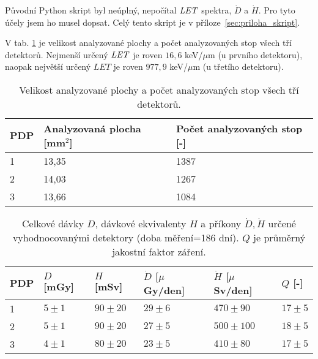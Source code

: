 
Původní Python skript byl neúplný, nepočítal $\mathit{LET}$ spektra, $\dot{D}$ a $\dot{H}$. Pro tyto účely jsem ho musel dopsat. Celý tento skript je v příloze~\ref{sec:priloha_skript}. 
 
V tab. \ref{tab:praktickaCast_analyzovanaPlocha} je velikost analyzované plochy a počet analyzovaných stop všech tří detektorů. Nejmenší určený $\mathit{LET}$ je roven $16,6$ keV/$\mu$m (u prvního detektoru), naopak největší určený $LET$ je roven $977,9$ keV/$\mu$m (u třetího detektoru). 
\begin{table}[H]
  \centering
  \caption{Velikost analyzované plochy a počet analyzovaných stop všech tří detektorů.}
  \label{tab:praktickaCast_analyzovanaPlocha}
  \begin{tabular}{lll}
	\toprule
	PDP&Analyzovaná plocha [mm$^2$]& Počet analyzovaných stop [-]\\
	\midrule
	1&13,35&1387\\
	2&14,03&1267\\
	3&13,66&1084\\
	\bottomrule
  \end{tabular}
\end{table}
\begin{table}[h]
  \centering
  \caption{Celkové dávky $D$, dávkové ekvivalenty $H$ a příkony $\dot{D},\dot{H}$ určené vyhodnocovanými detektory (doba měření=186 dní). $Q$ je průměrný jakostní faktor záření.}
  \label{tab:praktickaCast_davkyVysledky}
  \begin{tabular}{llllll}
	\toprule
	PDP&$D$ [mGy]&$H$ [mSv]&$\dot{D}$ [$\mu$Gy/den]&$\dot{H}$ [$\mu$Sv/den]& $Q$ [-]\\
	\midrule
	1&$5\pm1$&$90\pm20$&$29\pm6$&$470\pm90$&$17\pm5$\\
	2&$5\pm1$&$90\pm20$&$27\pm5$&$500\pm100$&$18\pm5$\\
	3&$4\pm1$&$80\pm20$&$23\pm5$&$410\pm80$&$17\pm5$\\
	\bottomrule
  \end{tabular}
\end{table}

